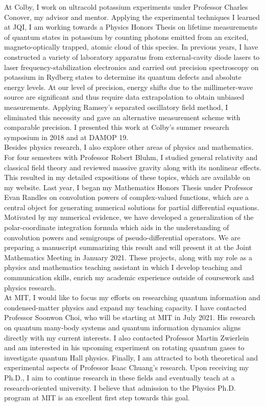 \documentclass[12pt]{article}
\begin{document}
At Colby, I work on ultracold potassium experiments under Professor Charles Conover, my advisor and mentor. Applying the experimental techniques I learned at JQI, I am working towards a Physics Honors Thesis on lifetime measurements of quantum states in potassium by counting photons emitted from an excited, magneto-optically trapped, atomic cloud of this species. In previous years, I have constructed a variety of laboratory apparatus from external-cavity diode lasers to laser frequency-stabilization electronics and carried out precision spectroscopy on potassium in Rydberg states to determine its quantum defects and absolute energy levels. At our level of precision, energy shifts due to the millimeter-wave source are significant and thus require data extrapolation to obtain unbiased measurements. Applying Ramsey's separated oscillatory field method, I eliminated this necessity and gave an alternative measurement scheme with comparable precision. I presented this work at Colby's summer research symposium in 2018 and at DAMOP 19.  \\

Besides physics research, I also explore other areas of physics and mathematics. For four semesters with Professor Robert Bluhm, I studied general relativity and classical field theory and reviewed massive gravity along with its nonlinear effects. This resulted in my detailed expositions of these topics, which are available on my website. Last year, I began my Mathematics Honors Thesis under Professor Evan Randles on convolution powers of complex-valued functions, which are a central object for generating numerical solutions for partial differential equations. Motivated by my numerical evidence, we have developed a generalization of the polar-coordinate integration formula which aids in the understanding of convolution powers and semigroups of pseudo-differential operators. We are preparing a manuscript summarizing this result and will present it at the Joint Mathematics Meeting in January 2021. These projects, along with my role as a physics and mathematics teaching assistant in which I develop teaching and communication skills, enrich my academic experience outside of coursework and physics research.  \\ 

At MIT, I would like to focus my efforts on researching quantum information and condensed-matter physics and  expand my teaching capacity. I have contacted Professor Soonwon Choi, who will be starting at MIT in July 2021. His research on quantum many-body systems and quantum information dynamics aligns directly with my current interests. I also contacted Professor Martin Zwierlein and am interested in his upcoming experiment on rotating quantum gases to investigate quantum Hall physics. Finally, I am attracted to both theoretical and experimental aspects of Professor Isaac Chuang's research. Upon receiving my Ph.D., I aim to continue research in these fields and eventually teach at a research-oriented university. I believe that admission to the Physics Ph.D. program at MIT is an excellent first step towards this goal. \\
\end{document}
